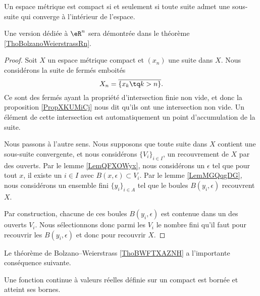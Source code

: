 \begin{theorem}\label{ThoBWFTXAZNH}
    Un espace métrique est compact si et seulement si toute suite admet une sous-suite qui converge à l'intérieur de l'espace.
\end{theorem}
Une version dédiée à \( \eR^n\) sera démontrée dans le théorème \ref{ThoBolzanoWeierstrassRn}.

\begin{proof}
   Soit \( X\) un espace métrique compact et \( (x_n)\) une suite dans \( X\). Nous considérons la suite de fermés emboités
   \begin{equation}
       X_n=\overline{ \{ x_k\tq k>n \} }.
   \end{equation}
   Ce sont des fermés ayant la propriété d'intersection finie non vide, et donc la proposition \ref{PropXKUMiCj} nous dit qu'ils ont une intersection non vide. Un élément de cette intersection est automatiquement un point d'accumulation de la suite.

   Nous passons à l'autre sens. Nous supposons que toute suite dans \( X\) contient une sous-suite convergente, et nous considérons \( \{ V_i \}_{i\in I}\), un recouvrement de \( X\) par des ouverts. Par le lemme \ref{LemQFXOWyx}, nous considérons un \( \epsilon\) tel que pour tout \( x\), il existe un \( i\in I\) avec \( B(x,\epsilon)\subset V_i\). Par le lemme \ref{LemMGQqgDG}, nous considérons un ensemble fini \( \{ y_i \}_{i\in A}\) tel que le boules \( B(y_i,\epsilon)\) recouvrent \( X\).

   Par construction, chacune de ces boules \( B(y_i,\epsilon)\) est contenue dans un des ouverts \( V_i\). Nous sélectionnons donc parmi les \( V_i\) le nombre fini qu'il faut pour recouvrir les \( B(y_i,\epsilon)\) et donc pour recouvrir \( X\).
\end{proof}

Le théorème de Bolzano–Weierstrass \ref{ThoBWFTXAZNH} a l'importante conséquence suivante.
\begin{theorem}[Weierstrass]		\label{ThoWeirstrassRn}
	Une fonction continue à valeurs réelles définie sur un compact est bornée et atteint ses bornes.
\end{theorem}

